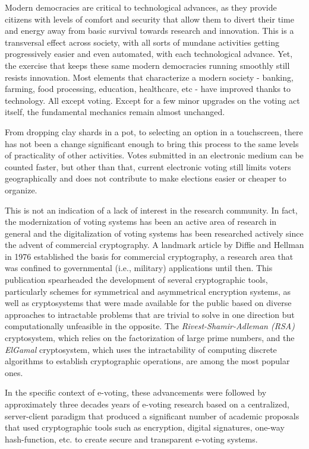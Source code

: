 \documentclass[../main.tex]{subfiles}
\begin{document}
    Modern democracies are critical to technological advances, as they provide citizens with levels of comfort and security that allow them to divert their time and energy away from basic survival towards research and innovation. This is a transversal effect across society, with all sorts of mundane activities getting progressively easier and even automated, with each technological advance.
    Yet, the exercise that keeps these same modern democracies running smoothly still resists innovation. Most elements that characterize a modern society - banking, farming, food processing, education, healthcare, etc - have improved thanks to technology. All except voting. Except for a few minor upgrades on the voting act itself, the fundamental mechanics remain almost unchanged.
    \par
    From dropping clay shards in a pot, to selecting an option in a touchscreen, there has not been a change significant enough to bring this process to the same levels of practicality of other activities. Votes submitted in an electronic medium can be counted faster, but other than that, current electronic voting still limits voters geographically and does not contribute to make elections easier or cheaper to organize.
    \par
    This is not an indication of a lack of interest in the research community. In fact, the modernization of voting systems has been an active area of research in general and the digitalization of voting systems has been researched actively since the advent of commercial cryptography. A landmark article by Diffie and Hellman in 1976 \cite{Diffie1976} established the basis for commercial cryptography, a research area that was confined to governmental (i.e., military) applications until then. This publication spearheaded the development of several cryptographic tools, particularly schemes for symmetrical and asymmetrical encryption systems, as well as cryptosystems that were made available for the public based on diverse approaches to intractable problems that are trivial to solve in one direction but computationally unfeasible in the opposite. The \textit{Rivest-Shamir-Adleman (RSA)} \cite{Rivest1983} cryptosystem, which relies on the factorization of large prime numbers, and the \textit{ElGamal} \cite{ElGamal1984} cryptosystem, which uses the intractability of computing discrete algorithms to establish cryptographic operations, are among the most popular ones.
    \par
    In the specific context of e-voting, these advancements were followed by approximately three decades years of e-voting research based on a centralized, server-client paradigm that produced a significant number of academic proposals that used cryptographic tools such as encryption, digital signatures, one-way hash-function, etc. to create secure and transparent e-voting systems.
\end{document}
